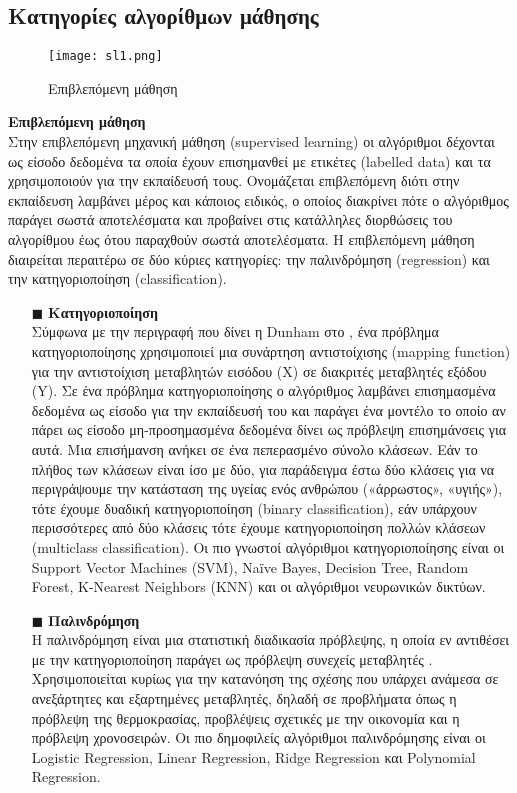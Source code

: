 \subsection{Κατηγορίες αλγορίθμων μάθησης}
\begin{figure}[H]
	\centering
	\texttt{[image: sl1.png]}
	\caption{Επιβλεπόμενη μάθηση}
	\label{fig:su}
\end{figure}
\noindent\textbf{Επιβλεπόμενη μάθηση}
\\
Στην επιβλεπόμενη μηχανική μάθηση (supervised learning) οι αλγόριθμοι δέχονται ως είσοδο δεδομένα τα οποία έχουν επισημανθεί με ετικέτες (labelled data) και τα χρησιμοποιούν για την εκπαίδευσή τους. Ονομάζεται επιβλεπόμενη διότι στην εκπαίδευση λαμβάνει μέρος και κάποιος ειδικός, ο οποίος διακρίνει πότε ο αλγόριθμος παράγει σωστά αποτελέσματα και προβαίνει στις κατάλληλες διορθώσεις του αλγορίθμου έως ότου παραχθούν σωστά αποτελέσματα.
Η επιβλεπόμενη μάθηση διαιρείται περαιτέρω σε δύο κύριες κατηγορίες: την παλινδρόμηση (regression) και την κατηγοριοποίηση (classification).
\newpage
\begin{itemize}
\item[$\blacksquare$]
\noindent\textbf{Κατηγοριοποίηση}\\
Σύμφωνα με την περιγραφή που δίνει η Dunham στο \cite{dunhamDataMiningIntroductory2002}, ένα πρόβλημα κατηγοριοποίησης χρησιμοποιεί μια συνάρτηση αντιστοίχισης (mapping function) για την αντιστοίχιση μεταβλητών εισόδου (X) σε διακριτές μεταβλητές εξόδου (Y). Σε ένα πρόβλημα κατηγοριοποίησης ο αλγόριθμος λαμβάνει επισημασμένα δεδομένα ως είσοδο για την εκπαίδευσή του και παράγει ένα μοντέλο το οποίο αν πάρει ως είσοδο μη-προσημασμένα δεδομένα δίνει ως πρόβλεψη επισημάνσεις για αυτά. Μια επισήμανση ανήκει σε ένα πεπερασμένο σύνολο κλάσεων. Εάν το πλήθος των κλάσεων είναι ίσο με δύο, για παράδειγμα έστω δύο κλάσεις για να περιγράψουμε την κατάσταση της υγείας ενός ανθρώπου («άρρωστος», «υγιής»), τότε έχουμε δυαδική κατηγοριοποίηση (binary classification), εάν υπάρχουν περισσότερες από δύο κλάσεις τότε έχουμε κατηγοριοποίηση πολλών κλάσεων (multiclass classification). Οι πιο γνωστοί αλγόριθμοι κατηγοριοποίησης είναι οι Support Vector Machines (SVM), Naïve Bayes, Decision Tree, Random Forest, Κ-Nearest Neighbors (KNN) και οι αλγόριθμοι νευρωνικών δικτύων.
\item[$\blacksquare$] \noindent\textbf{Παλινδρόμηση}\\
Η παλινδρόμηση είναι μια στατιστική διαδικασία πρόβλεψης, η οποία εν αντιθέσει με την κατηγοριοποίηση παράγει ως πρόβλεψη συνεχείς μεταβλητές \cite{hastie2009elements}. Χρησιμοποιείται κυρίως για την κατανόηση της σχέσης που υπάρχει ανάμεσα σε ανεξάρτητες και εξαρτημένες μεταβλητές, δηλαδή σε προβλήματα όπως η πρόβλεψη της θερμοκρασίας, προβλέψεις σχετικές με την οικονομία και η πρόβλεψη χρονοσειρών. Οι πιο δημοφιλείς αλγόριθμοι παλινδρόμησης είναι οι Logistic Regression, Linear Regression, Ridge Regression και Polynomial Regression.
\\
\end{itemize}
